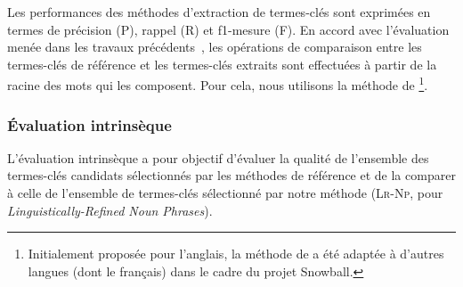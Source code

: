         Les performances des méthodes d'extraction de termes-clés sont exprimées
        en termes de précision (P), rappel (R) et f1-mesure (F). En
        accord avec l'évaluation menée dans les travaux
        précédents~\cite{kim2010semeval}, les opérations de comparaison entre
        les termes-clés de référence et les termes-clés extraits sont effectuées
        à partir de la racine des mots qui les composent. Pour cela, nous
        utilisons la méthode de
        \footnote{Initialement proposée pour
        l'anglais, la méthode de  a été
        adaptée à d'autres langues (dont le français) dans le cadre du projet
        Snowball.}.

      \subsubsection{Évaluation intrinsèque}
      \label{subsubsec:main:domain_independent_keyphrase_extraction-keyphrase_candidate_selection-evaluation-intrinsic_evaluation}
        L'évaluation intrinsèque a pour objectif d'évaluer la qualité de
        l'ensemble des termes-clés candidats sélectionnés par les méthodes de
        référence et de la comparer à celle de l'ensemble de termes-clés
        sélectionné par notre méthode (\textsc{Lr-Np}, pour
        \textit{Linguistically-Refined Noun Phrases}).

